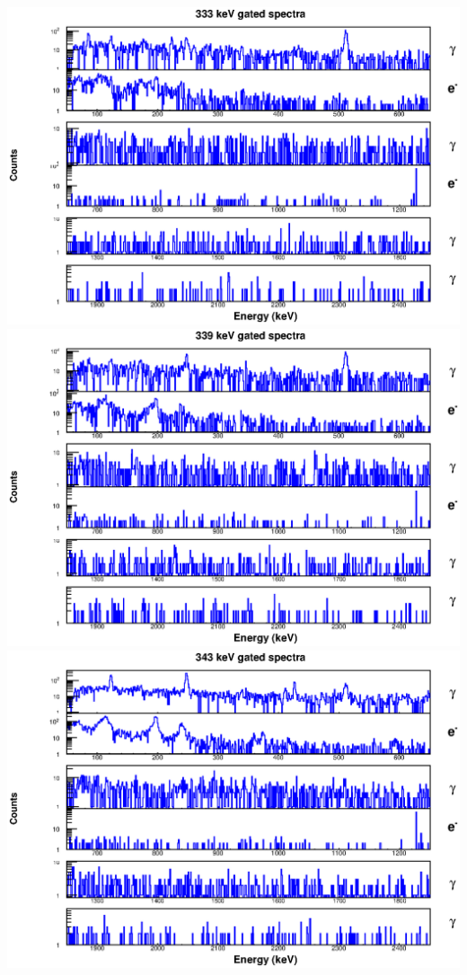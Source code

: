 \includegraphics[scale=0.8]{154Gd_Appendix/333_combined.eps}
\includegraphics[scale=0.8]{154Gd_Appendix/339_combined.eps}
\includegraphics[scale=0.8]{154Gd_Appendix/343_combined.eps}
